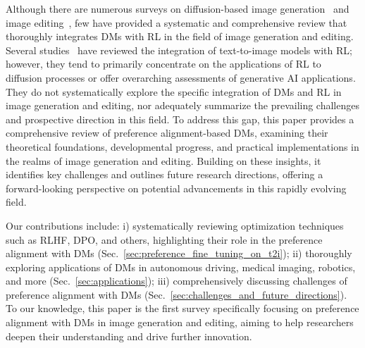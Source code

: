 Although there are numerous surveys on diffusion-based image generation~\citep{DBLP:journals/corr/abs-2303-07909} and image editing~\citep{DBLP:journals/corr/abs-2402-17525}, few have provided a systematic and comprehensive review that thoroughly integrates DMs with RL in the field of image generation and editing. Several studies~\citep{DBLP:journals/corr/abs-2407-13734,du2023beyond,DBLP:journals/corr/abs-2308-14328} have reviewed the integration of text-to-image models with RL; however, they tend to primarily concentrate on the applications of RL to diffusion processes or offer overarching assessments of generative AI applications. They do not systematically explore the specific integration of DMs and RL in image generation and editing, nor adequately summarize the prevailing challenges and prospective direction in this field. To address this gap, this paper provides a comprehensive review of preference alignment-based DMs, examining their theoretical foundations, developmental progress, and practical implementations in the realms of image generation and editing. Building on these insights, it identifies key challenges and outlines future research directions, offering a forward-looking perspective on potential advancements in this rapidly evolving field.

Our contributions include: i) systematically reviewing optimization techniques such as RLHF, DPO, and others, highlighting their role in the preference alignment with DMs (Sec.~\ref{sec:preference_fine_tuning_on_t2i}); ii) thoroughly exploring applications of DMs in autonomous driving, medical imaging, robotics, and more (Sec.~\ref{sec:applications}); iii) comprehensively discussing challenges of preference alignment with DMs (Sec.~\ref{sec:challenges_and_future_directions}). To our knowledge, this paper is the first survey specifically focusing on preference alignment with DMs in image generation and editing, aiming to help researchers deepen their understanding and drive further innovation.%